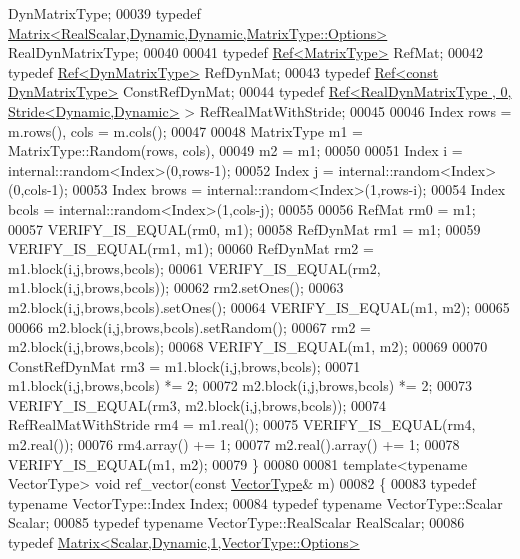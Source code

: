 \begin{DoxyCode}
       DynMatrixType;
00039   \textcolor{keyword}{typedef} \hyperlink{group___core___module_class_eigen_1_1_matrix}{Matrix<RealScalar,Dynamic,Dynamic,MatrixType::Options>}
       RealDynMatrixType;
00040   
00041   \textcolor{keyword}{typedef} \hyperlink{group___core___module_class_eigen_1_1_ref}{Ref<MatrixType>} RefMat;
00042   \textcolor{keyword}{typedef} \hyperlink{group___core___module_class_eigen_1_1_ref}{Ref<DynMatrixType>} RefDynMat;
00043   \textcolor{keyword}{typedef} \hyperlink{group___core___module_class_eigen_1_1_ref}{Ref<const DynMatrixType>} ConstRefDynMat;
00044   \textcolor{keyword}{typedef} \hyperlink{group___core___module_class_eigen_1_1_ref}{Ref<RealDynMatrixType , 0, Stride<Dynamic,Dynamic>}
       > RefRealMatWithStride;
00045 
00046   Index rows = m.rows(), cols = m.cols();
00047   
00048   MatrixType  m1 = MatrixType::Random(rows, cols),
00049               m2 = m1;
00050   
00051   Index i = internal::random<Index>(0,rows-1);
00052   Index j = internal::random<Index>(0,cols-1);
00053   Index brows = internal::random<Index>(1,rows-i);
00054   Index bcols = internal::random<Index>(1,cols-j);
00055   
00056   RefMat rm0 = m1;
00057   VERIFY\_IS\_EQUAL(rm0, m1);
00058   RefDynMat rm1 = m1;
00059   VERIFY\_IS\_EQUAL(rm1, m1);
00060   RefDynMat rm2 = m1.block(i,j,brows,bcols);
00061   VERIFY\_IS\_EQUAL(rm2, m1.block(i,j,brows,bcols));
00062   rm2.setOnes();
00063   m2.block(i,j,brows,bcols).setOnes();
00064   VERIFY\_IS\_EQUAL(m1, m2);
00065   
00066   m2.block(i,j,brows,bcols).setRandom();
00067   rm2 = m2.block(i,j,brows,bcols);
00068   VERIFY\_IS\_EQUAL(m1, m2);
00069   
00070   ConstRefDynMat rm3 = m1.block(i,j,brows,bcols);
00071   m1.block(i,j,brows,bcols) *= 2;
00072   m2.block(i,j,brows,bcols) *= 2;
00073   VERIFY\_IS\_EQUAL(rm3, m2.block(i,j,brows,bcols));
00074   RefRealMatWithStride rm4 = m1.real();
00075   VERIFY\_IS\_EQUAL(rm4, m2.real());
00076   rm4.array() += 1;
00077   m2.real().array() += 1;
00078   VERIFY\_IS\_EQUAL(m1, m2);
00079 \}
00080 
00081 \textcolor{keyword}{template}<\textcolor{keyword}{typename} VectorType> \textcolor{keywordtype}{void} ref\_vector(\textcolor{keyword}{const} \hyperlink{struct_vector_type}{VectorType}& m)
00082 \{
00083   \textcolor{keyword}{typedef} \textcolor{keyword}{typename} VectorType::Index Index;
00084   \textcolor{keyword}{typedef} \textcolor{keyword}{typename} VectorType::Scalar Scalar;
00085   \textcolor{keyword}{typedef} \textcolor{keyword}{typename} VectorType::RealScalar RealScalar;
00086   \textcolor{keyword}{typedef} \hyperlink{group___core___module_class_eigen_1_1_matrix}{Matrix<Scalar,Dynamic,1,VectorType::Options>} 

\end{DoxyCode}
